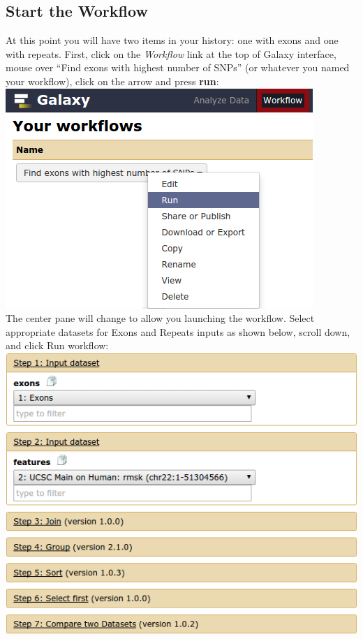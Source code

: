 \documentclass[11pt,a4paper]{article}
\begin{document}
\subsection{Start the Workflow}
At this point you will have two items in your history: one with exons and one with repeats. First, click on the \textit{Workflow} link at the top of Galaxy interface, mouse over ``Find exons with highest number of SNPs'' (or whatever you named your workflow), click on the arrow and press \textbf{run}:
\includegraphics[scale=0.55]{figures/101_37}\\
The center pane will change to allow you launching the workflow. Select appropriate datasets for Exons and Repeats inputs as shown below, scroll down, and click Run workflow:\\
\includegraphics[scale=0.55]{figures/101_38}\\
\end{document}
